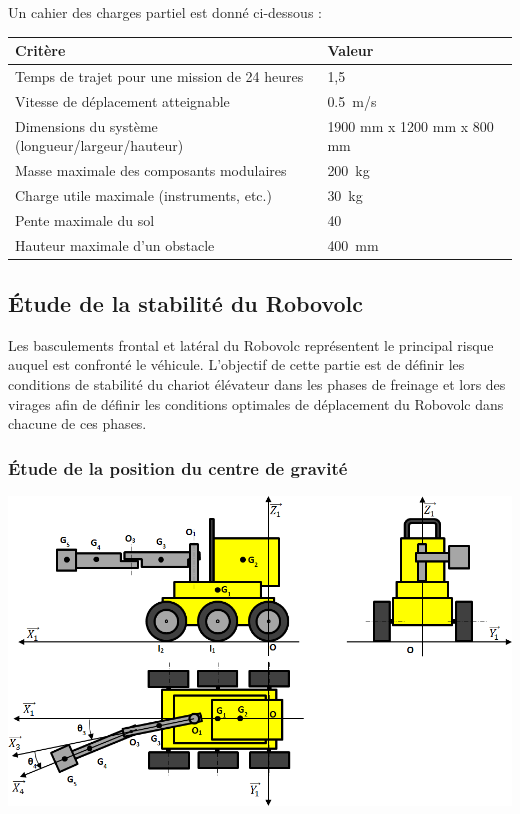 \documentclass[10pt,fleqn]{article} %
\begin{document}
\begin{multicols}{2}
Un cahier des charges partiel est donné ci-dessous :
\begin{center}
\begin{tabular}{|p{5cm}|p{2cm}|}
\hline
Critère & Valeur \\ \hline
Temps de trajet pour une mission de 24 heures & 1,5 \\ \hline
Vitesse de déplacement atteignable	& \SI{0,5}{m/s} \\ \hline
Dimensions du système (longueur/largeur/hauteur)& 1900 mm x 1200 mm x 800 mm \\ \hline
Masse maximale des composants modulaires & \SI{200}{kg}\\ \hline
Charge utile maximale (instruments, etc.)	& \SI{30}{kg} \\ \hline
Pente maximale du sol	& 40\degres \\ \hline
Hauteur maximale d'un obstacle 	& \SI{400}{mm}\\ \hline
\end{tabular}
\end{center}

\subsection*{Étude de la stabilité du Robovolc}
Les basculements frontal et latéral du Robovolc représentent le principal risque auquel est confronté le véhicule. L’objectif de cette partie est de définir les conditions de stabilité du chariot élévateur dans les phases de freinage et lors des virages afin de définir les conditions optimales de déplacement du Robovolc dans chacune de ces phases.

\subsubsection*{Étude de la position du centre de gravité}

\begin{center}
\includegraphics[width=\linewidth]{images/fig_04}
\end{center}



\end{multicols}
\end{document}
